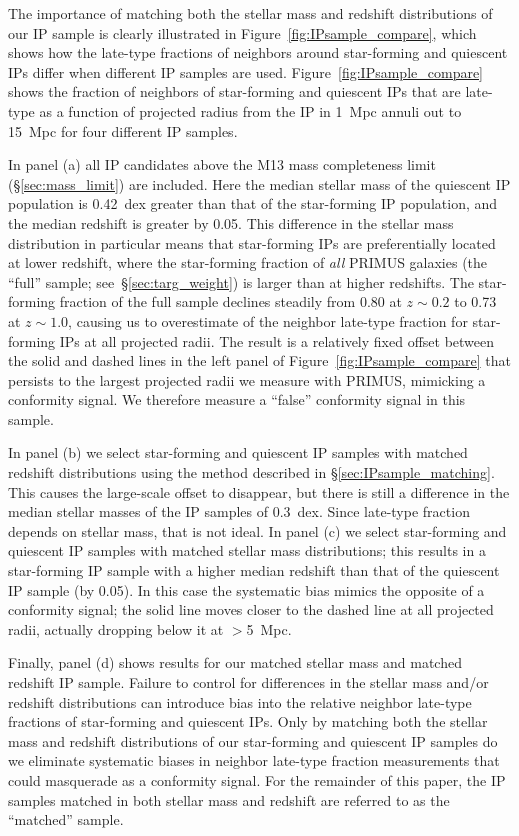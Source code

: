 The importance of matching both the stellar mass and redshift distributions of our 
IP sample is clearly illustrated in Figure~\ref{fig:IPsample_compare}, which shows 
how the late-type fractions of neighbors around star-forming and quiescent IPs 
differ when different IP samples are used.
Figure~\ref{fig:IPsample_compare} shows the fraction of neighbors of star-forming 
and quiescent IPs that are late-type as a function of projected radius from the 
IP in 1~Mpc annuli out to 15~Mpc for four different IP samples.
%

In panel (a) all IP candidates above the M13 mass completeness limit 
(\S\ref{sec:mass_limit}) are included.
Here the median stellar mass of the quiescent IP population is 0.42~dex greater 
than that of the star-forming IP population, and the median redshift is greater 
by 0.05.
This difference in the stellar mass distribution in particular means that 
star-forming IPs are preferentially located at lower redshift, where the star-forming fraction of \emph{all} PRIMUS galaxies (the ``full'' sample; see~\S\ref{sec:targ_weight}) is larger than at higher redshifts.  The star-forming fraction of the full sample declines steadily from 0.80 at $z\sim0.2$ to 0.73 at $z\sim1.0$, causing us to overestimate of the neighbor late-type fraction for star-forming IPs at all projected radii.
The result is a relatively fixed offset between the solid and dashed lines in the 
left panel of Figure~\ref{fig:IPsample_compare} that persists to the largest 
projected radii we measure with PRIMUS, mimicking a conformity signal.  We therefore
measure a ``false'' conformity signal in this sample.

In panel (b) we select star-forming and quiescent IP samples with matched redshift 
distributions using the method described in \S\ref{sec:IPsample_matching}.  This 
causes the large-scale offset to disappear, but there is still a difference in the 
median stellar masses of the IP samples of 0.3~dex.  Since late-type fraction depends on stellar mass, that is not ideal. 
In panel (c) we select star-forming and quiescent IP samples with matched stellar mass distributions; this results in a star-forming IP sample with a higher median 
redshift than that of the quiescent IP sample (by 0.05).
In this case the systematic bias mimics the opposite of a conformity signal; the solid line moves closer to the dashed line at all projected radii, actually dropping below it at $>$5~Mpc.

Finally, panel (d) shows results for our matched stellar mass and matched redshift IP sample.
Failure to control for differences in the stellar mass and/or redshift distributions 
can introduce bias into the relative neighbor late-type fractions of star-forming and quiescent IPs.
Only by matching both the stellar mass and redshift distributions of our star-forming and quiescent IP samples do we eliminate systematic biases in neighbor late-type fraction measurements that could masquerade as a conformity signal.
For the remainder of this paper, the IP samples matched in both stellar mass and redshift are referred to as the ``matched'' sample.


